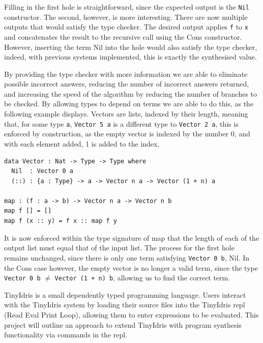\documentclass[a4paper]{article}
\begin{document}
Filling in the first hole is straightforward, since the expected output 
is the \texttt{Nil} constructor. The second, however, is more interesting.
There are now multiple outputs that would satisfy the type checker. 
The desired output applies \texttt{f} to \texttt{x} and concatenates the result to the
recursive call using the Cons constructor. However, inserting the term
Nil into the hole would also satisfy the type checker, indeed,
with previous systems implemented, this is exactly the synthesised 
value.

By providing the type checker with more information we are able to 
eliminate possible incorrect answers, reducing the number of incorrect 
answers returned, and increasing the speed of the algorithm by reducing the number of 
branches to be checked. By allowing types to depend on terms we are 
able to do this, as the following example displays. Vectors are lists,
indexed by their length, meaning that, for some type \texttt{a},
\texttt{Vector 5 a} is a different type to \texttt{Vector 2 a}, this
is enforced by construction, as the empty vector is indexed by the
number 0, and with each element added, 1 is added to the index.  

\begin{center}
\begin{verbatim}
data Vector : Nat -> Type -> Type where
  Nil  : Vector 0 a
  (::) : {a : Type} -> a -> Vector n a -> Vector (1 + n) a

map : (f : a -> b) -> Vector n a -> Vector n b
map f [] = []
map f (x :: y) = f x :: map f y
\end{verbatim}
\end{center}

It is now enforced within the type signature of map that the length of
each of the output list must equal that of the input list. The process
for the first hole remains unchanged, since there is 
only one term satisfying \texttt{Vector 0 b}, Nil.
In the Cons case however, the empty vector is no longer a valid term,
since the type \texttt{Vector 0 b} \(\neq\) \texttt{Vector (1 + n) b},
allowing us to find the correct term. 

TinyIdris is a small dependently typed programming language.
Users interact with the TinyIdris system by loading their source files
into the TinyIdris repl (Read Eval Print Loop), allowing them to enter
expressions to be evaluated. This project
will outline an approach to extend TinyIdris with program synthesis
functionality via commands in the repl.
\end{document}
